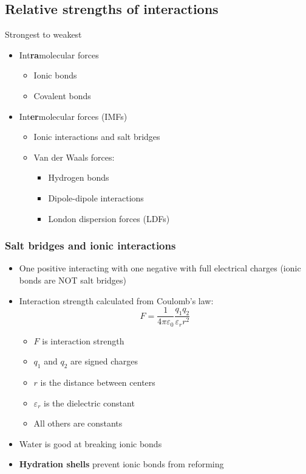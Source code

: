 \documentclass[letterpaper, 12pt]{article}
\begin{document}
\subsection*{Relative strengths of interactions}
Strongest to weakest
\begin{itemize}
\item Int\textbf{ra}molecular forces
\begin{itemize}
\item Ionic bonds
\item Covalent bonds
\end{itemize}
\item Int\textbf{er}molecular forces (IMFs)
\begin{itemize}
\item Ionic interactions and salt bridges
\item Van der Waals forces:
\begin{itemize}
\item Hydrogen bonds
\item Dipole-dipole interactions
\item London dispersion forces (LDFs)
\end{itemize}
\end{itemize}
\end{itemize}

\subsubsection*{Salt bridges and ionic interactions}

\begin{itemize}
\item One positive interacting with one negative with full electrical charges (ionic bonds are NOT salt bridges)
\item Interaction strength calculated from Coulomb's law: $$ F = \frac{1}{4 \pi \varepsilon_0 } \frac{q_1q_2}{\varepsilon_r r^2}$$
\begin{itemize}
\item $F$ is interaction strength
\item $q_1$ and $q_2$ are signed charges
\item $r$ is the distance between centers
\item $\varepsilon_r$ is the dielectric constant
\item All others are constants
\end{itemize}
\item Water is good at breaking ionic bonds
\item \textbf{Hydration shells} prevent ionic bonds from reforming
\end{itemize}
\end{document}
